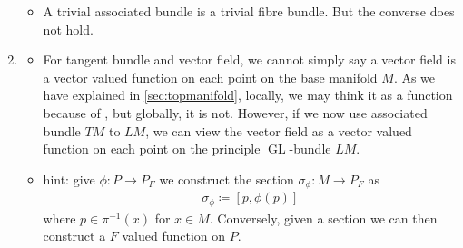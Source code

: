 \documentclass{article}
\newcommand{\GL}{\operatorname{GL}}
\begin{document}
\begin{enumerate}
\begin{itemize}
    \item A trivial associated bundle is a trivial fibre bundle. But the converse does not hold.
\end{itemize}

\item {}
\begin{itemize}
    \item {} For tangent bundle and vector field, we cannot simply say a vector field is a vector valued function on each point on the base manifold $M$. As we have explained in \cref{sec:topmanifold},  locally, we may think it as a function because of , but globally, it is not. However, if we now use associated bundle $TM$ to $LM$, we can view the vector field as a vector valued function on each point on the principle $\GL$-bundle $LM$.
    \item {\tiny hint:
give $\phi: P\to P_F$ we construct the section $\sigma_{\phi}:M\to P_F$ as 
\begin{align*}
    \sigma_{\phi} \coloneqq [p, \phi(p)]
\end{align*}
where $p\in \pi^{-1}(x)$ for $x\in M$. Conversely, given a section we can then construct a $F$ valued function on $P$.
}
\end{itemize}






\end{enumerate}
\end{document}
